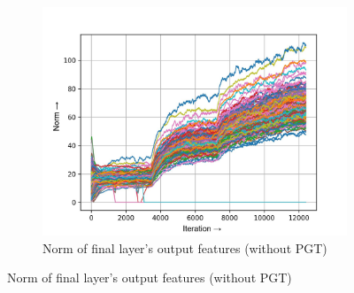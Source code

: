 \documentclass[times,sort&compress]{elsarticle}
\begin{document}
\begin{figure}[t]
\begin{subfigure}[t]{0.33\textwidth}
\includegraphics[width=\textwidth]{baseline-f-layer-22-1}
\caption{Norm of final layer's output features (without PGT)}
\end{subfigure}


\end{figure}
\end{document}
